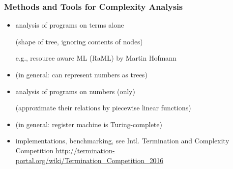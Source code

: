\begin{frame}[fragile]
\frametitle{Methods and Tools for Complexity Analysis}

  \begin{itemize}[<+->]
\item analysis of programs on terms alone 

(shape of tree, ignoring contents of nodes) 

e.g., resource aware ML (RaML) by Martin Hofmann
\item (in general: can represent numbers as trees)
\item analysis of programs on numbers (only) 

  (approximate their relations by piecewise linear functions)
\item (in general: register machine is Turing-complete)

\item implementations, benchmarking, 
see Intl. Termination and Complexity Competition 
\url{http://termination-portal.org/wiki/Termination_Competition_2016}
  \end{itemize}

\end{frame}
